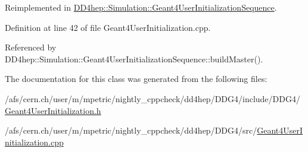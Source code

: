 Reimplemented in \hyperlink{class_d_d4hep_1_1_simulation_1_1_geant4_user_initialization_sequence_aec8d9a6016af25e06531351ba0f49418}{DD4hep::Simulation::Geant4UserInitializationSequence}.

Definition at line 42 of file Geant4UserInitialization.cpp.

Referenced by DD4hep::Simulation::Geant4UserInitializationSequence::buildMaster().

The documentation for this class was generated from the following files:\begin{DoxyCompactItemize}
\item 
/afs/cern.ch/user/m/mpetric/nightly\_\-cppcheck/dd4hep/DDG4/include/DDG4/\hyperlink{_geant4_user_initialization_8h}{Geant4UserInitialization.h}\item 
/afs/cern.ch/user/m/mpetric/nightly\_\-cppcheck/dd4hep/DDG4/src/\hyperlink{_geant4_user_initialization_8cpp}{Geant4UserInitialization.cpp}\end{DoxyCompactItemize}
